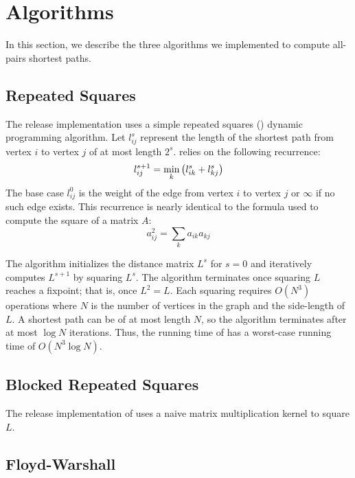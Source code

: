 \section{Algorithms}\label{sec:algo}
In this section, we describe the three algorithms we implemented to compute
all-pairs shortest paths.

\subsection{Repeated Squares}
The release implementation uses a simple repeated squares (\rs) dynamic
programming algorithm. Let $l_{ij}^s$ represent the length of the shortest path
from vertex $i$ to vertex $j$ of at most length $2^s$. \rs{} relies on the
following recurrence:
\[
  l_{ij}^{s+1} = \min_k \left({l_{ik}^s + l_{kj}^s}\right)
\]
The base case $l_{ij}^0$ is the weight of the edge from vertex $i$ to vertex
$j$ or $\infty$ if no such edge exists. This recurrence is nearly identical to
the formula used to compute the square of a matrix $A$:
\[
  a_{ij}^2 = \sum_k a_{ik} a_{kj}
\]

The algorithm initializes the distance matrix $L^s$ for $s=0$ and iteratively
computes $L^{s+1}$ by squaring $L^s$. The algorithm terminates once squaring
$L$ reaches a fixpoint; that is, once $L^2 = L$. Each squaring requires
$O(N^3)$ operations where $N$ is the number of vertices in the graph and the
side-length of $L$. A shortest path can be of at most length $N$, so the
algorithm terminates after at most $\log N$ iterations. Thus, the running time
of \rs{} has a worst-case running time of $O(N^3 \log N)$.

\subsection{Blocked Repeated Squares}
The release implementation of \rs{} uses a naive matrix multiplication kernel
to square $L$.


\subsection{Floyd-Warshall}
